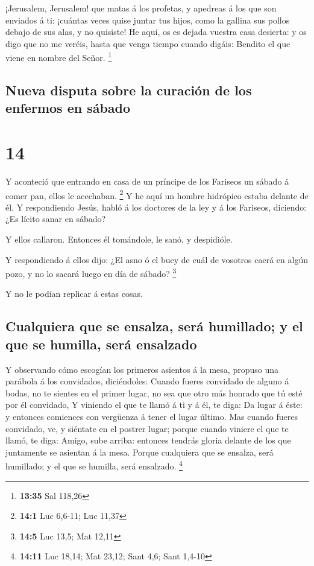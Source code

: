  ¡Jerusalem, Jerusalem! que matas á los profetas, y
apedreas á los que son enviados á ti: ¡cuántas veces quise juntar tus
hijos, como la gallina sus pollos debajo de sus alas, y no quisiste!
 He aquí, os es dejada vuestra casa desierta: y os digo que
no me veréis, hasta que venga tiempo cuando digáis: Bendito el que viene
en nombre del Señor. \footnote{\textbf{13:35} Sal 118,26}

\hypertarget{nueva-disputa-sobre-la-curaciuxf3n-de-los-enfermos-en-suxe1bado}{%
\subsection{Nueva disputa sobre la curación de los enfermos en
sábado}\label{nueva-disputa-sobre-la-curaciuxf3n-de-los-enfermos-en-suxe1bado}}

\hypertarget{section-13}{%
\section{14}\label{section-13}}

 Y aconteció que entrando en casa de un príncipe de los
Fariseos un sábado á comer pan, ellos le acechaban. \footnote{\textbf{14:1}
  Luc 6,6-11; Luc 11,37}  Y he aquí un hombre hidrópico
estaba delante de él.  Y respondiendo Jesús, habló á los
doctores de la ley y á los Fariseos, diciendo: ¿Es lícito sanar en
sábado?

 Y ellos callaron. Entonces él tomándole, le sanó, y
despidióle.

 Y respondiendo á ellos dijo: ¿El asno ó el buey de cuál de
vosotros caerá en algún pozo, y no lo sacará luego en día de sábado?
\footnote{\textbf{14:5} Luc 13,5; Mat 12,11}

 Y no le podían replicar á estas cosas.

\hypertarget{cualquiera-que-se-ensalza-seruxe1-humillado-y-el-que-se-humilla-seruxe1-ensalzado}{%
\subsection{Cualquiera que se ensalza, será humillado; y el que se
humilla, será
ensalzado}\label{cualquiera-que-se-ensalza-seruxe1-humillado-y-el-que-se-humilla-seruxe1-ensalzado}}

 Y observando cómo escogían los primeros asientos á la mesa,
propuso una parábola á los convidados, diciéndoles:  Cuando
fueres convidado de alguno á bodas, no te sientes en el primer lugar, no
sea que otro más honrado que tú esté por él convidado,  Y
viniendo el que te llamó á ti y á él, te diga: Da lugar á éste: y
entonces comiences con vergüenza á tener el lugar último. 
Mas cuando fueres convidado, ve, y siéntate en el postrer lugar; porque
cuando viniere el que te llamó, te diga: Amigo, sube arriba: entonces
tendrás gloria delante de los que juntamente se asientan á la mesa.
 Porque cualquiera que se ensalza, será humillado; y el que
se humilla, será ensalzado. \footnote{\textbf{14:11} Luc 18,14; Mat
  23,12; Sant 4,6; Sant 1,4-10}

